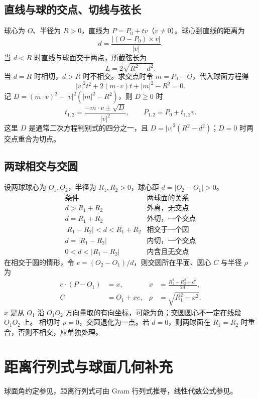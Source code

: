 \documentclass[../main.tex]{subfiles}
\begin{document}
\subsection{直线与球的交点、切线与弦长}
球心为 $O$、半径为 $R>0$，直线为 $P=P_0+tv$（$v\ne0$）。球心到直线的距离为
\[
d=\frac{|(O-P_0)\times v|}{|v|}.
\]
当 $d<R$ 时直线与球面交于两点，所截弦长为
\[
L=2\sqrt{R^2-d^2}.
\]
当 $d=R$ 时相切，$d>R$ 时不相交。求交点时令 $m=P_0-O$，代入球面方程得
\[
|v|^2t^2+2(m\cdot v)t+|m|^2-R^2=0.
\]
记 $D=(m\cdot v)^2-|v|^2(|m|^2-R^2)$，则 $D\ge0$ 时
\[
t_{1,2}=\frac{-m\cdot v\pm\sqrt D}{|v|^2},\qquad
P_{1,2}=P_0+t_{1,2}v.
\]
这里 $D$ 是通常二次方程判别式的四分之一，且 $D=|v|^2(R^2-d^2)$；$D=0$ 时两交点重合为切点。
\par\pagebreak[0]
\begin{samepage}
\subsection{两球相交与交圆}
设两球球心为 $O_1,O_2$，半径为 $R_1,R_2>0$，球心距 $d=|O_2-O_1|>0$。
\[
\begin{array}{c|c}
\text{条件}&\text{两球面的关系}\\\hline
d>R_1+R_2&\text{外离，无交点}\\
d=R_1+R_2&\text{外切，一个交点}\\
|R_1-R_2|<d<R_1+R_2&\text{相交于一个圆}\\
d=|R_1-R_2|&\text{内切，一个交点}\\
0<d<|R_1-R_2|&\text{内含且无交点}
\end{array}
\]
在相交于圆的情形，令 $e=(O_2-O_1)/d$，则交圆所在平面、圆心 $C$ 与半径 $\rho$ 为
\begin{align*}
e\cdot(P-O_1)&=x, & x&=\frac{R_1^2-R_2^2+d^2}{2d},\\
C&=O_1+xe, & \rho&=\sqrt{R_1^2-x^2}.
\end{align*}
$x$ 是从 $O_1$ 沿 $O_1O_2$ 方向量取的有向坐标，可能为负；交圆圆心不一定在线段 $O_1O_2$ 上。
相切时 $\rho=0$，交圆退化为一点。若 $d=0$，则两球面在 $R_1=R_2$ 时重合，否则不相交，应单独处理。
\par\end{samepage}
\section{距离行列式与球面几何补充}
球面角约定参见\cite{geometry}，距离行列式可由 Gram 行列式推导，线性代数公式参见\cite{matrix}。
\end{document}
